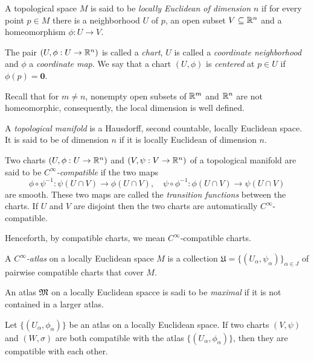 \begin{definition}
    A topological space $M$ is said to be \textit{locally Euclidean of dimension $n$} if for every point $p\in M$ there is a neighborhood $U$ of $p$, an open subset $V\subseteq\mathbb{R}^n$ and a homeomorphism $\phi: U\to V$.

    The pair $(U,\phi: U\to\mathbb{R}^n)$ is called a \textit{chart}, $U$ is called a \textit{coordinate neighborhood} and $\phi$ a \textit{coordinate map}. We say that a chart $(U,\phi)$ is \textit{centered} at $p\in U$ if $\phi(p) = \mathbf 0$.
\end{definition}

Recall that for $m\ne n$, nonempty open subsets of $\mathbb{R}^m$ and $\mathbb{R}^n$ are not homeomorphic, consequently, the local dimension is well defined.

\begin{definition}[Manifold]
    A \textit{topological manifold} is a Hausdorff, second countable, locally Euclidean space. It is said to be of dimension $n$ if it is locally Euclidean of dimension $n$.
\end{definition}

\begin{definition}
    Two charts $(U,\phi: U\to\mathbb{R}^n)$ and $(V,\psi: V\to\mathbb{R}^n)$ of a topological manifold are said to be \textit{$C^\infty$-compatible} if the two maps 
    \begin{equation*}
        \phi\circ\psi^{-1}:\psi(U\cap V)\to\phi(U\cap V),\quad \psi\circ\phi^{-1}:\phi(U\cap V)\to\psi(U\cap V)
    \end{equation*}
    are smooth. These two maps are called the \textit{transition functions} between the charts. If $U$ and $V$ are disjoint then the two charts are automatically $C^\infty$-compatible.
\end{definition}

Henceforth, by compatible charts, we mean $C^\infty$-compatible charts.

\begin{definition}[Atlas]
    A \textit{$C^\infty$-atlas} on a locally Euclidean space $M$ is a collection $\mathfrak U = \{(U_\alpha,\psi_\alpha)\}_{\alpha\in J}$ of pairwise compatible charts that cover $M$.

    An atlas $\mathfrak{M}$ on a locally Euclidean spacce is sadi to be \textit{maximal} if it is not contained in a larger atlas.
\end{definition}

\begin{lemma}
    Let $\{(U_\alpha,\phi_\alpha)\}$ be an atlas on a locally Euclidean space. If two charts $(V,\psi)$ and $(W,\sigma)$ are both compatible with the atlas $\{(U_\alpha,\phi_\alpha)\}$, then they are compatible with each other.
\end{lemma}
